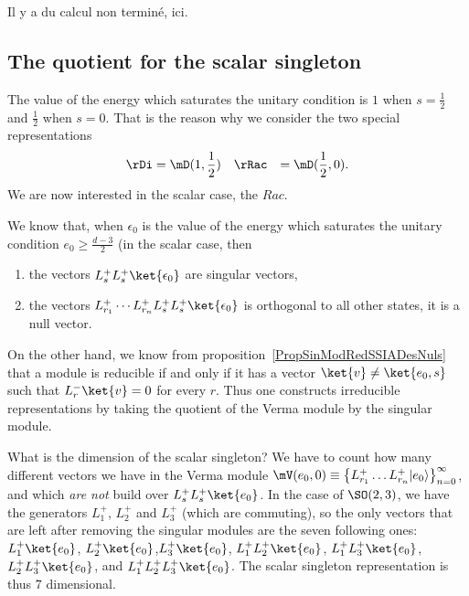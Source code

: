 \begin{probleme}
Il y a du calcul non terminé, ici.
\end{probleme}

					\subsection{The quotient for the scalar singleton}

The value of the energy which saturates the unitary condition is $1$ when $s=\frac{1}{ 2 }$ and $\frac{ 1 }{2}$ when $s=0$. That is the reason why we consider the two special representations
\begin{equation}
	\begin{aligned}[]
		\rDi&=\mD(1,\frac{ 1 }{2})		&& \rRac&=\mD(\frac{ 1 }{2},0).
	\end{aligned}
\end{equation}
We are now interested in the scalar case, the $Rac$.

We know that, when $\epsilon_0$ is the value of the energy which saturates the unitary condition $e_0\geq \frac{ d-3 }{ 2 }$ (in the scalar case, then
\begin{enumerate}
\item the vectors $L^+_sL^+_s\ket{\epsilon_0}$ are singular vectors,
\item the vectors $L^+_{r_1}\cdots L^+_{r_n}L^+_sL^+_s\ket{\epsilon_0}$ is orthogonal to all other states, it is a null vector.
\end{enumerate}
On the other hand, we know from proposition~\ref{PropSinModRedSSIADesNuls} that a module is reducible if and only if it has a vector $\ket{v}\neq\ket{e_0,s}$ such that $L^-_r\ket{v}=0$ for every $r$. Thus one constructs irreducible representations by taking the quotient of the Verma module by the singular module.

What is the dimension of the scalar singleton? We have to count how many different vectors we have in the Verma module $\mV(e_0,0)\equiv \big\{   L_{r_1}^+\ldots L_{r_n}^+| e_0 \rangle   \big\}_{n=0}^{\infty}$, and which \emph{are not} build over $L^+_sL^+_s\ket{e_0}$. In the case of $\SO(2,3)$, we have the generators $L^+_1$, $L^+_2$ and $L^+_3$ (which are commuting), so the only vectors that are left after removing the singular modules are the seven following ones: $L^+_1\ket{e_0}$, $L^+_2\ket{e_0}$,$L^+_3\ket{e_0}$, $L^+_1L^+_2\ket{e_0}$, $L^+_1L^+_3\ket{e_0}$,$L^+_2L^+_3\ket{e_0}$, and $L^+_1L^+_2L^+_3\ket{e_0}$. The scalar singleton representation is thus $7$ dimensional.
